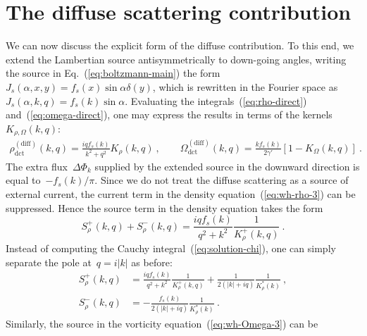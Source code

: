 \documentclass[preprint,aps,eqsecnum, prb]{revtex4-1}
\newcommand{\fplus}[1]{{#1}^{+}}
\newcommand{\fminus}[1]{{#1}^{-}}
\newcommand{\dct}[1]{{#1}_\mathrm{dct}}
\begin{document}


\section{The diffuse scattering contribution}
\label{sec:diffuse}

We can now discuss the explicit form of the diffuse contribution.
To this end, we extend the Lambertian
source antisymmetrically to down-going angles,
writing the source in Eq.~(\ref{eq:boltzmann-main}) the form
$J_{s}(\alpha, x, y) =  f_s(x) \sin\alpha \delta(y)$,
which is rewritten in the Fourier space
as~$J_{s}(\alpha, k, q) = f_s(k) \sin\alpha$.
Evaluating the integrals~(\ref{eq:rho-direct}) and~(\ref{eq:omega-direct}),
one may express the results in terms of the kernels~$K_{\rho, \Omega}(k, q)$:
\begin{align}
\dct{\rho}^\mathrm{(diff)}(k, q) = \frac{iq f_s(k)}{k^2 + q^2} K_\rho(k, q)\ ,
\qquad
\dct{\Omega}^\mathrm{(diff)}(k, q)
  = \frac{k f_s(k)}{2\gamma'} \left[1 - K_\Omega(k, q)\right] \ .
\end{align}
The extra flux~$\Delta\Phi_{k}$
supplied by the extended source in the downward direction
is equal to~$-f_s(k)/\pi$.
Since we do not treat the diffuse scattering as a source of external current,
the current term in the density equation~(\ref{eq:wh-rho-3}) can
be suppressed.
Hence the source term in the density equation takes the form
\begin{equation}
  \fplus{S}_\rho(k, q) + \fminus{S}_\rho(k, q) =
  \frac{iq f_s(k)}{q^2 + k^2} \frac{1}{\fplus{K}_\rho(k, q)}\ .
\end{equation}
Instead of computing the Cauchy integral~(\ref{eq:solution-chi}),
one can simply separate the pole at~$q = i|k|$ as before:
\begin{align}
  \fplus{S}_\rho(k, q) &= \frac{iq f_s(k)}{q^2 + k^2}
  \frac{1}{\fplus{K}_\rho(k, q)}
  + \frac{1}{2(|k| + iq)} \frac{1}{K_\rho^\ast(k)}\ , \\
  \fminus{S}_\rho(k, q) &= - \frac{f_s(k)}{2(|k| + iq)}
                          \frac{1}{K_\rho^\ast(k)}
  \ .
\end{align}
Similarly, the source in the vorticity equation~(\ref{eq:wh-Omega-3}) can be
\end{document}
